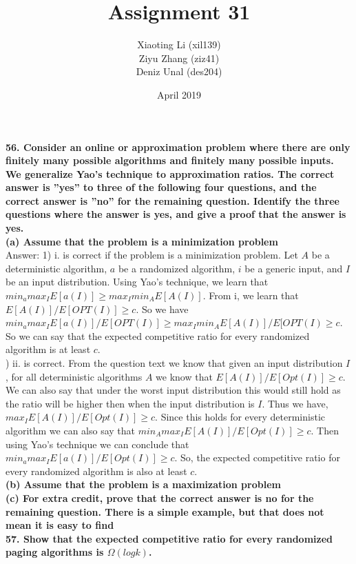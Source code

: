 \documentclass{article}
\title{Assignment 31}
\author{Xiaoting Li (xil139) \\
Ziyu Zhang (ziz41) \\
Deniz Unal (des204)}
\date{April 2019}
\begin{document}
\noindent
\textbf{56. Consider an online or approximation problem where there are only finitely many possible algorithms and finitely many possible inputs. We generalize Yao’s technique to approximation ratios. The correct answer is ”yes” to three of the following four questions, and the correct answer is ”no” for the remaining question. Identify the three questions where the answer is yes, and give a proof that the answer is yes.} \\ \newline
\textbf{(a) Assume that the problem is a minimization problem} \\ \newline
Answer: 1) i. is correct if the problem is a minimization problem. Let $A$ be a deterministic algorithm, $a$ be a randomized algorithm, $i$ be a generic input, and $I$ be an input distribution. Using Yao's technique, we learn that $min_a max_I E[a(I)] \geq max_I min_A E[A(I)]$. From i, we learn that $E[A(I)]/E[OPT(I)] \geq c$. So we have $min_a max_I E[a(I)]/E[OPT(I)] \geq max_I min_A E[A(I)]/E[OPT(I) \geq c$. So we can say that the expected competitive ratio for every randomized algorithm is at least $c$. \\ ) ii. is correct. From the question text we know that given an input distribution $I$, for all deterministic algorithms $A$ we know that $E[A(I)] / E[Opt(I)] \geq c$. We can also say that under the worst input distribution this would still hold as the ratio will be higher then when the input distribution is $I$. Thus we have, $max_I E[A(I)] / E[Opt(I)] \geq c$. Since this holds for every deterministic algorithm we can also say that $min_A max_I E[A(I)] / E[Opt(I)] \geq c$. Then using Yao's technique we can conclude that $min_a max_I E[a(I)] / E[Opt(I)] \geq c$. So, the expected competitive ratio for every randomized algorithm is also at least $c$. \\ \newline
\textbf{(b) Assume that the problem is a maximization problem} \\ \newline
\textbf{(c) For extra credit, prove that the correct answer is no for the remaining question. There is a simple example, but that does not mean it is easy to find} \\ \newline
\textbf{57. Show that the expected competitive ratio for every randomized paging algorithms is
$\Omega(logk)$.}
\end{document}
